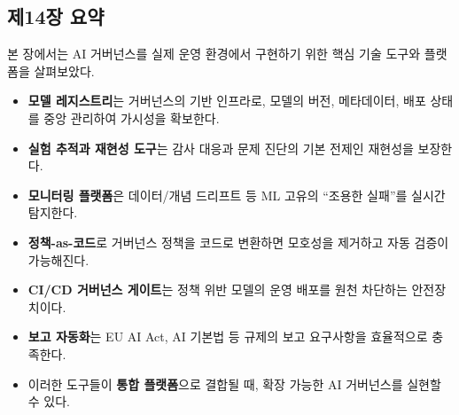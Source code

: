 \subsection*{제14장 요약}

본 장에서는 AI 거버넌스를 실제 운영 환경에서 구현하기 위한 핵심 기술 도구와 플랫폼을 살펴보았다.

\begin{itemize}
    \item \textbf{모델 레지스트리}는 거버넌스의 기반 인프라로, 모델의 버전, 메타데이터, 배포 상태를 중앙 관리하여 가시성을 확보한다.
    \item \textbf{실험 추적과 재현성 도구}는 감사 대응과 문제 진단의 기본 전제인 재현성을 보장한다.
    \item \textbf{모니터링 플랫폼}은 데이터/개념 드리프트 등 ML 고유의 ``조용한 실패''를 실시간 탐지한다.
    \item \textbf{정책-as-코드}로 거버넌스 정책을 코드로 변환하면 모호성을 제거하고 자동 검증이 가능해진다.
    \item \textbf{CI/CD 거버넌스 게이트}는 정책 위반 모델의 운영 배포를 원천 차단하는 안전장치이다.
    \item \textbf{보고 자동화}는 EU AI Act, AI 기본법 등 규제의 보고 요구사항을 효율적으로 충족한다.
    \item 이러한 도구들이 \textbf{통합 플랫폼}으로 결합될 때, 확장 가능한 AI 거버넌스를 실현할 수 있다.
\end{itemize}
